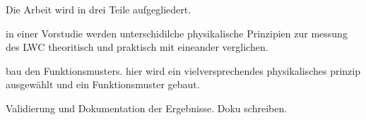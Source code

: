 Die Arbeit wird in drei Teile aufgegliedert.

in einer Vorstudie werden unterschidilche physikalische Prinzipien zur messung des LWC theoritisch und praktisch mit eineander verglichen.

bau den Funktionsmusters. hier wird ein vielversprechendes physikalisches prinzip ausgewählt und ein Funktionsmuster gebaut.

Validierung und Dokumentation der Ergebnisse. Doku schreiben.

